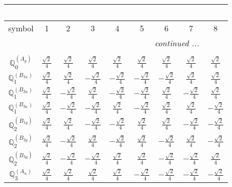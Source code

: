 \documentclass[fleqn,10pt,landscape]{article}
\begin{document}
\begin{itemize}
{\begin{center}
\begin{longtable}{ccccccccc}
\multicolumn{8}{l}{\tablename\ \thetable{}} \\
 \hline \hline
symbol & 1 & 2 & 3 & 4 & 5 & 6 & 7 & 8 \\ \hline \endhead

 \hline \hline
\multicolumn{8}{r}{\footnotesize\it continued ...} \\ \endfoot

 \hline \hline
\multicolumn{8}{r}{} \\ \endlastfoot

$\mathbb{Q}_{0}^{(A_{g})}$ & $ \frac{\sqrt{2}}{4} $ & $ \frac{\sqrt{2}}{4} $ & $ \frac{\sqrt{2}}{4} $ & $ \frac{\sqrt{2}}{4} $ & $ \frac{\sqrt{2}}{4} $ & $ \frac{\sqrt{2}}{4} $ & $ \frac{\sqrt{2}}{4} $ & $ \frac{\sqrt{2}}{4} $ \\ \hline
$\mathbb{Q}_{1}^{(B_{1u})}$ & $ \frac{\sqrt{2}}{4} $ & $ \frac{\sqrt{2}}{4} $ & $ - \frac{\sqrt{2}}{4} $ & $ - \frac{\sqrt{2}}{4} $ & $ - \frac{\sqrt{2}}{4} $ & $ - \frac{\sqrt{2}}{4} $ & $ \frac{\sqrt{2}}{4} $ & $ \frac{\sqrt{2}}{4} $ \\ \hline
$\mathbb{Q}_{1}^{(B_{2u})}$ & $ \frac{\sqrt{2}}{4} $ & $ - \frac{\sqrt{2}}{4} $ & $ \frac{\sqrt{2}}{4} $ & $ - \frac{\sqrt{2}}{4} $ & $ - \frac{\sqrt{2}}{4} $ & $ \frac{\sqrt{2}}{4} $ & $ - \frac{\sqrt{2}}{4} $ & $ \frac{\sqrt{2}}{4} $ \\ \hline
$\mathbb{Q}_{1}^{(B_{3u})}$ & $ \frac{\sqrt{2}}{4} $ & $ - \frac{\sqrt{2}}{4} $ & $ - \frac{\sqrt{2}}{4} $ & $ \frac{\sqrt{2}}{4} $ & $ - \frac{\sqrt{2}}{4} $ & $ \frac{\sqrt{2}}{4} $ & $ \frac{\sqrt{2}}{4} $ & $ - \frac{\sqrt{2}}{4} $ \\ \hline
$\mathbb{Q}_{2}^{(B_{1g})}$ & $ \frac{\sqrt{2}}{4} $ & $ \frac{\sqrt{2}}{4} $ & $ - \frac{\sqrt{2}}{4} $ & $ - \frac{\sqrt{2}}{4} $ & $ \frac{\sqrt{2}}{4} $ & $ \frac{\sqrt{2}}{4} $ & $ - \frac{\sqrt{2}}{4} $ & $ - \frac{\sqrt{2}}{4} $ \\ \hline
$\mathbb{Q}_{2}^{(B_{2g})}$ & $ \frac{\sqrt{2}}{4} $ & $ - \frac{\sqrt{2}}{4} $ & $ \frac{\sqrt{2}}{4} $ & $ - \frac{\sqrt{2}}{4} $ & $ \frac{\sqrt{2}}{4} $ & $ - \frac{\sqrt{2}}{4} $ & $ \frac{\sqrt{2}}{4} $ & $ - \frac{\sqrt{2}}{4} $ \\ \hline
$\mathbb{Q}_{2}^{(B_{3g})}$ & $ \frac{\sqrt{2}}{4} $ & $ - \frac{\sqrt{2}}{4} $ & $ - \frac{\sqrt{2}}{4} $ & $ \frac{\sqrt{2}}{4} $ & $ \frac{\sqrt{2}}{4} $ & $ - \frac{\sqrt{2}}{4} $ & $ - \frac{\sqrt{2}}{4} $ & $ \frac{\sqrt{2}}{4} $ \\ \hline
$\mathbb{Q}_{3}^{(A_{u})}$ & $ \frac{\sqrt{2}}{4} $ & $ \frac{\sqrt{2}}{4} $ & $ \frac{\sqrt{2}}{4} $ & $ \frac{\sqrt{2}}{4} $ & $ - \frac{\sqrt{2}}{4} $ & $ - \frac{\sqrt{2}}{4} $ & $ - \frac{\sqrt{2}}{4} $ & $ - \frac{\sqrt{2}}{4} $ \\
\end{longtable}
\end{center}
}
\end{itemize}
\end{document}
